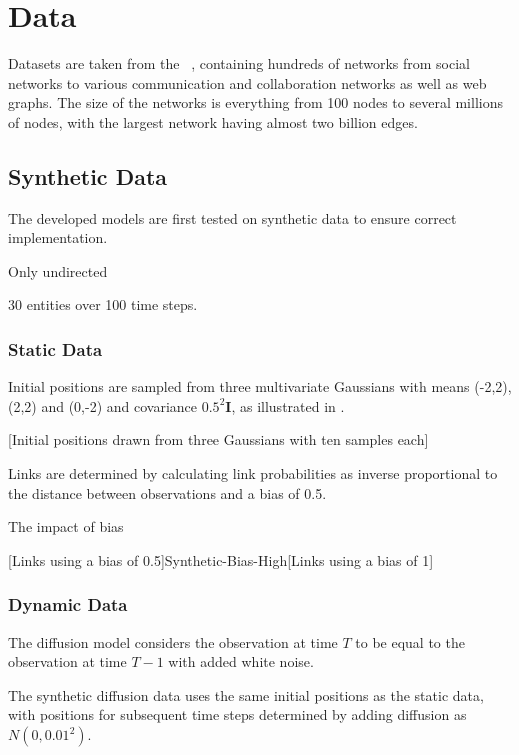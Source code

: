 \chapter{Data}\label{ch:Data}

Datasets are taken from the ~\cite{snapnets}, containing hundreds of networks from social networks to various communication and collaboration networks as well as web graphs. The size of the networks is everything from 100 nodes to several millions of nodes, with the largest network having almost two billion edges.


\section{Synthetic Data}

    The developed models are first tested on synthetic data to ensure correct implementation. 
    
    Only undirected
    
    30 entities over 100 time steps.
    
    \subsection{Static Data}
    
        Initial positions are sampled from three multivariate Gaussians with means (-2,2), (2,2) and (0,-2) and covariance $0.5^2\bm{I}$, as illustrated in .

        [Initial positions drawn from three Gaussians with ten samples each]
                
        Links are determined by calculating link probabilities as inverse proportional to the distance between observations and a bias of 0.5.
        
        The impact of bias
        
        [Links using a bias of 0.5]{Synthetic-Bias-High}[Links using a bias of 1]
    
    \subsection{Dynamic Data}
    
        The diffusion model considers the observation at time $T$ to be equal to the observation at time $T-1$ with added white noise.
    
        The synthetic diffusion data uses the same initial positions as the static data, with positions for subsequent time steps determined by adding diffusion as $N(0,0.01^2)$. 
        
